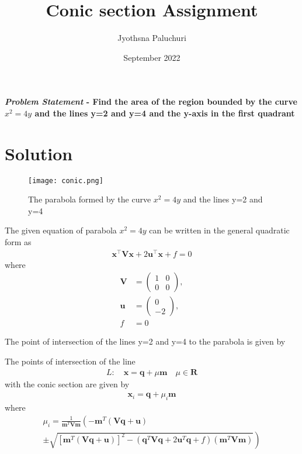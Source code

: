 \documentclass[journal,10pt,twocolumn]{article}
\title{\textbf{Conic section Assignment}}
\author{Jyothsna Paluchuri}
\date{September 2022}
\let\vec\mathbf
\newcommand{\myvec}[1]{\ensuremath{\begin{pmatrix}#1\end{pmatrix}}}
\providecommand{\brak}[1]{\ensuremath{\left(#1\right)}}
\providecommand{\lbrak}[1]{\ensuremath{\left(#1\right.}}
\providecommand{\rbrak}[1]{\ensuremath{\left.#1\right)}}
\providecommand{\sbrak}[1]{\ensuremath{{}\left[#1\right]}}
\begin{document}
\maketitle
\paragraph{\textit{Problem Statement} - Find the area of the region bounded by the curve $x^2=4y$ and the lines y=2 and y=4 and the y-axis in the first quadrant}

\section*{\large Solution}

\begin{figure}[h]
\centering
\texttt{[image: conic.png]}

\caption{The parabola formed by the curve $x^2 = 4y$ and the lines y=2 and y=4}
\label{fig:parabola}
\end{figure}

The given equation of parabola $x^2 = 4y$ can be written in the general quadratic form as
\begin{align}
    \label{eq:conic_quad_form}
    \vec{x}^{\top}\vec{V}\vec{x}+2\vec{u}^{\top}\vec{x}+f=0
    \end{align}
where
\begin{align}
	\label{eq:V_matrix}
	\vec{V} &= \myvec{1 & 0\\0 & 0},
	\\
	\label{eq:u_vector}
	\vec{u} &= \myvec{0\\-2},
	\\
	\label{eq:f_value}
	f &= 0
\end{align}



The point of intersection of the lines y=2 and y=4 to the parabola is given by



The points of intersection of the line 
\begin{align}
	L: \quad \vec{x} = \vec{q} + \mu \vec{m} \quad \mu \in \mathbf{R}
\label{eq:conic_tangent}
\end{align}
with the conic section are given by
\begin{align}
\vec{x}_i = \vec{q} + \mu_i \vec{m}
\label{eq:conic_tangent_pts}
\end{align}
%
where
{\tiny
\begin{multline}
\mu_i = \frac{1}
{
\vec{m}^T\vec{V}\vec{m}
}
\lbrak{-\vec{m}^T\brak{\vec{V}\vec{q}+\vec{u}}}
\\
\pm
\rbrak{\sqrt{
\sbrak{
\vec{m}^T\brak{\vec{V}\vec{q}+\vec{u}}
}^2
-
\brak
{
\vec{q}^T\vec{V}\vec{q} + 2\vec{u}^T\vec{q} +f
}
\brak{\vec{m}^T\vec{V}\vec{m}}
}
}
\label{eq:tangent_roots}
\end{multline}
}
\end{document}
